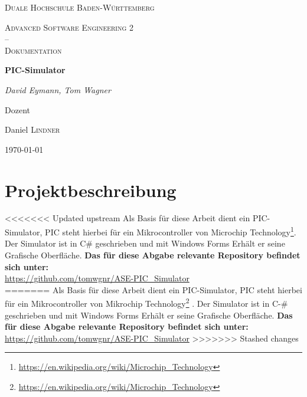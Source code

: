 \documentclass[12pt,a4paper,titlepage,ngerman,pdftex]{report}
\begin{document}
    \begin{titlepage}
        \centering
        {\scshape\LARGE Duale Hochschule Baden-Württemberg \par}
        \vspace{1cm}
        {\scshape\Large Advanced Software Engineering 2 \\--\\ Dokumentation\par}
        \vspace{1.5cm}
        {\huge\bfseries PIC-Simulator\par}
        \vspace{2cm}
        {\Large\itshape David Eymann, Tom Wagner\par}
        \vfill
        Dozent\par
        Daniel \textsc{Lindner}

        \vfill

        {\large \today\par}
    \end{titlepage}

    \tableofcontents
    \listoffigures
    \lstlistoflistings

    \onehalfspacing

    \chapter{Projektbeschreibung}\label{ch:projektbeschreibung}
<<<<<<< Updated upstream
    Als Basis für diese Arbeit dient ein PIC-Simulator, PIC steht hierbei für ein Mikrocontroller von Microchip Technology\footnote{\url{https://en.wikipedia.org/wiki/Microchip_Technology}}.
    Der Simulator ist in C\# geschrieben und mit Windows Forms Erhält er seine Grafische Oberfläche.
    \textbf{Das für diese Abgabe relevante Repository befindet sich unter:} \\ \url{https://github.com/tomwgnr/ASE-PIC_Simulator}\\
=======
    Als Basis für diese Arbeit dient ein PIC-Simulator, PIC steht hierbei für ein Mikrocontroller von Mikrochip Technology\footnote{\url{https://en.wikipedia.org/wiki/Microchip_Technology}} .
    Der Simulator ist in C-\# geschrieben und mit Windows Forms Erhält er seine Grafische Oberfläche.
    \textbf{Das für diese Abgabe relevante Repository befindet sich unter:} \url{https://github.com/tomwgnr/ASE-PIC_Simulator}
>>>>>>> Stashed changes
    
\end{document}
